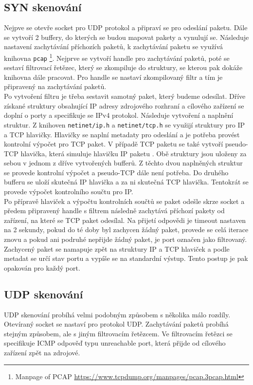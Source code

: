 \documentclass[a4paper, 11pt]{article}
\begin{document}
\subsection{SYN skenování}
Nejpve se otevře socket pro UDP protokol a připraví se pro odeslání paketu. Dále se vytvoří 2 buffery, do kterých se budou mapovat pakety a vynulují se. Následuje nastavení zachytávání příchozích paketů, k zachytávání paketu se využívá knihovna \texttt{pcap} \footnote{Manpage of PCAP \url{https://www.tcpdump.org/manpages/pcap.3pcap.html}}. Nejprve se vytvoří handle pro zachytávání paketů, poté se sestaví filtrovací řetězec, který se zkompiluje do struktury, se kterou pak dokáže knihovna dále pracovat. Pro handle se nastaví zkompilovaný filtr a tím je připravený na zachytávání paketů. \\

\noindent Po vytvoření filtru je třeba sestavit samotný paket, který budeme odesílat. Dříve získané struktury obsahující IP adresy zdrojového rozhraní a cílového zařízení se doplní o porty a specifikuje se IPv4 protokol. Následuje vytvoření a naplnění struktur. Z knihoven \texttt{netinet/ip.h} a \texttt{netinet/tcp.h} se využijí struktury pro IP a TCP hlavičky. Hlavičky se naplní metadaty pro odeslání a je potřeba provést kontrolní výpočet pro TCP paket. V případě TCP paketu se také vytvoří pseudo-TCP hlavička, která simuluje hlavičku IP paketu \cite{checksumwiki}. Obě struktury jsou uloženy za sebou v jednom z dříve vytvořených bufferů. Z těchto dvou naplněných struktur se provede kontrolní výpočet a pseudo-TCP dále není potřeba. Do druhého bufferu se uloží skutečná IP hlavička a za ni skutečná TCP hlavička. Tentokrát se provede výpočet kontrolního součtu pro IP.\\

\noindent Po přípravě hlaviček a výpočtu kontrolních součtů se paket odešle skrze socket a předem připravený handle s filtrem následně zachytává příchozí pakety od zařízení, na které se TCP paket odesílal. Na přijetí odpovědi je timeout nastaven na 2 sekundy, pokud do té doby byl zachycen žádný paket, provede se celá iterace znovu a pokud ani podruhé nepřijde žádný paket, je port označen jako filtrovaný. Zachycený paket se namapuje zpět na struktury IP a TCP hlaviček a podle metadat se určí stav portu a vypíše se na standardní výstup. Tento postup je pak opakován pro každý port.

\subsection{UDP skenování}
UDP skenování probíhá velmi podobným způsobem s několika málo rozdíly. Otevíraný socket se nastaví pro protokol UDP.
Zachytávání paketů probíhá stejným způsobem, ale s jiným filtrovacím řetězcem. Ve filtrovacím řetězci se specifikuje ICMP odpověď typu unreachable port, která přijde od cílového zařízení zpět na zdrojové.\\
\end{document}

